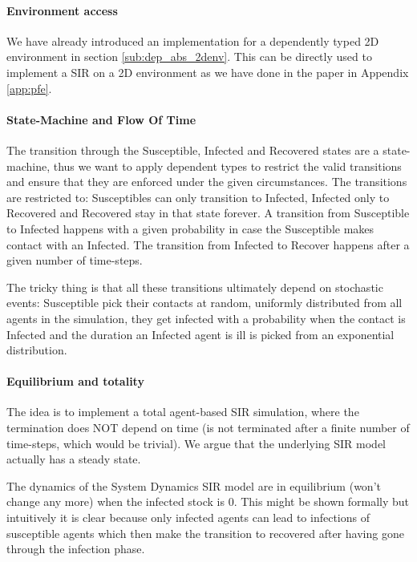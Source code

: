 \paragraph{Environment access}
We have already introduced an implementation for a dependently typed 2D environment in section \ref{sub:dep_abs_2denv}. This can be directly used to implement a SIR on a 2D environment as we have done in the paper in Appendix \ref{app:pfe}.

\paragraph{State-Machine and Flow Of Time}
The transition through the Susceptible, Infected and Recovered states are a state-machine, thus we want to apply dependent types to restrict the valid transitions and ensure that they are enforced under the given circumstances. The transitions are restricted to: Susceptibles can only transition to Infected, Infected only to Recovered and Recovered stay in that state forever. A transition from Susceptible to Infected happens with a given probability in case the Susceptible makes contact with an Infected. The transition from Infected to Recover happens after a given number of time-steps.

The tricky thing is that all these transitions ultimately depend on stochastic events: Susceptible pick their contacts at random, uniformly distributed from all agents in the simulation, they get infected with a probability when the contact is Infected and the duration an Infected agent is ill is picked from an exponential distribution.

\paragraph{Equilibrium and totality}
The idea is to implement a total agent-based SIR simulation, where the termination does NOT depend on time (is not terminated after a finite number of time-steps, which would be trivial).  We argue that the underlying SIR model actually has a steady state.

The dynamics of the System Dynamics SIR model are in equilibrium (won't change any more) when the infected stock is 0. This might be shown formally but intuitively it is clear because only infected agents can lead to infections of susceptible agents which then make the transition to recovered after having gone through the infection phase. 

